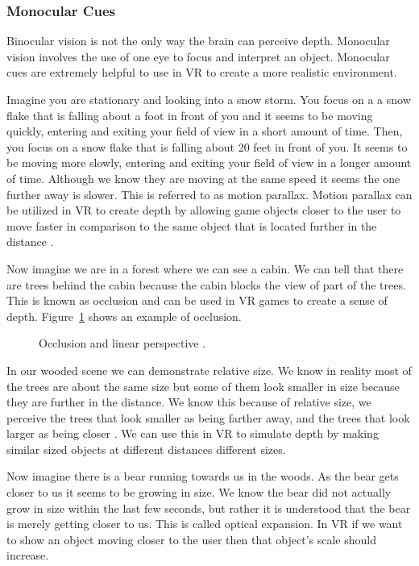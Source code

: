 \subsubsection{Monocular Cues}
Binocular vision is not the only way the brain can perceive depth. Monocular vision involves the use of one eye to focus and interpret an object. Monocular cues are extremely helpful to use in VR to create a more realistic environment.   


Imagine you are stationary and looking into a snow storm. You focus on a a snow flake that is falling about a foot in front of you and it seems to be moving quickly, entering and exiting your field of view in a short amount of time. Then, you focus on a snow flake that is falling about 20 feet in front of you. It seems to be moving more slowly, entering and exiting your field of view in a longer amount of time. Although we know they are moving at the same speed it seems the one further away is slower. This is referred to as motion parallax. Motion parallax can be utilized in VR to create depth by allowing game objects closer to the user to move faster in comparison to the same object that is located further in the distance \cite{JIS2}. 


Now imagine we are in a forest where we can see a cabin. We can tell that there are trees behind the cabin because the cabin blocks the view of part of the trees. This is known as occlusion and can be used in VR games to create a sense of depth. Figure~\ref{fig:Perspective} shows an example of occlusion. 
\begin{figure}[!ht]
	\begin{center}
	\end{center}
	\caption{Occlusion and linear perspective \cite{JIS3}.} \label{fig:Perspective}
\end{figure} 


In our wooded scene we can demonstrate relative size. We know in reality most of the trees are about the same size but some of them look smaller in size because they are further in the distance. We know this because of relative size, we perceive the trees that look smaller as being farther away, and the trees that look larger as being closer \cite{JIS2}. We can use this in VR to simulate depth by making similar sized objects at different distances different sizes.


Now imagine there is a bear running towards us in the woods. As the bear gets closer to us it seems to be growing in size. We know the bear did not actually grow in size within the last few seconds, but rather it is understood that the bear is merely getting closer to us. This is called optical expansion. In VR if we want to show an object moving closer to the user then that object's scale should increase. 


